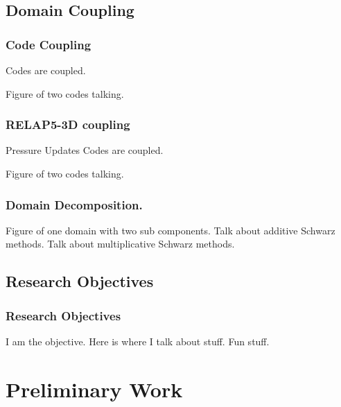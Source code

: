 \documentclass[compress,xcolor=table]{beamer}
\begin{document}
\subsection[Domain Coupling]{Domain Coupling}
\begin{frame}
\frametitle{Code Coupling}

Codes are coupled.

Figure of two codes talking.

\end{frame}
\begin{frame}
\frametitle{RELAP5-3D coupling}

Pressure Updates
Codes are coupled.

Figure of two codes talking.

\end{frame}
\begin{frame}
\frametitle{Domain Decomposition.}

Figure of one domain with two sub components.
Talk about additive Schwarz methods.
Talk about multiplicative Schwarz methods.

\end{frame}
\subsection[Research Objectives]{Research Objectives}
\begin{frame}
\frametitle{Research Objectives}

I am the objective.
Here is where I talk about stuff.
Fun stuff.

\end{frame}
\section[Preliminary Work]{Preliminary Work}
\end{document}

